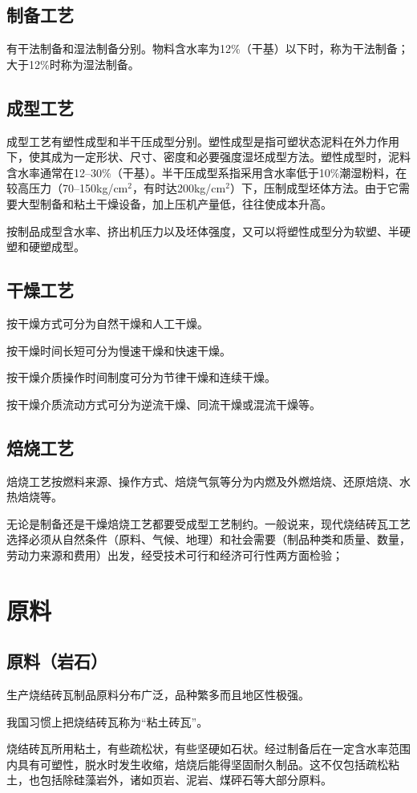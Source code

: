 \documentclass{ctexbook}
\begin{document}
\subsection{制备工艺}
有干法制备和湿法制备分别。物料含水率为12\%（干基）以下时，称为干法制备；大于12\%时称为湿法制备。
\subsection{成型工艺}
成型工艺有塑性成型和半干压成型分别。塑性成型是指可塑状态泥料在外力作用下，使其成为一定形状、尺寸、密度和必要强度湿坯成型方法。塑性成型时，泥料含水率通常在12--30\%（干基）。半干压成型系指采用含水率低于10\%潮湿粉料，在较高压力（70--150kg/cm$^{2}$，有时达200kg/cm$^{2}$）下，压制成型坯体方法。由于它需要大型制备和粘土干燥设备，加上压机产量低，往往使成本升高。

按制品成型含水率、挤出机压力以及坯体强度，又可以将塑性成型分为软塑、半硬塑和硬塑成型。
\subsection{干燥工艺}
按干燥方式可分为自然干燥和人工干燥。

按干燥时间长短可分为慢速干燥和快速干燥。

按干燥介质操作时间制度可分为节律干燥和连续干燥。

按干燥介质流动方式可分为逆流干燥、同流干燥或混流干燥等。
\subsection{焙烧工艺}
焙烧工艺按燃料来源、操作方式、焙烧气氛等分为内燃及外燃焙烧、还原焙烧、水热焙烧等。

无论是制备还是干燥焙烧工艺都要受成型工艺制约。一般说来，现代烧结砖瓦工艺选择必须从自然条件（原料、气候、地理）和社会需要（制品种类和质量、数量，劳动力来源和费用）出发，经受技术可行和经济可行性两方面检验；
\section{原料}
\subsection{原料（岩石）}
生产烧结砖瓦制品原料分布广泛，品种繁多而且地区性极强。

我国习惯上把烧结砖瓦称为“粘土砖瓦”。

烧结砖瓦所用粘土，有些疏松状，有些坚硬如石状。经过制备后在一定含水率范围内具有可塑性，脱水时发生收缩，焙烧后能得坚固耐久制品。这不仅包括疏松粘土，也包括除硅藻岩外，诸如页岩、泥岩、煤砰石等大部分原料。
\end{document}
